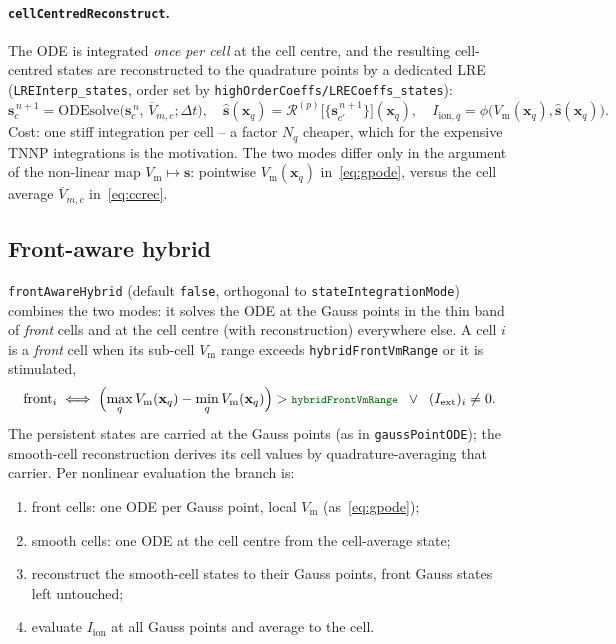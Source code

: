 \documentclass[11pt,a4paper]{article}
\newcommand{\code}[1]{\texttt{\small #1}}
\newcommand{\Vm}{V_{\text{m}}}
\newcommand{\Iion}{I_{\mathrm{ion}}}
\newcommand{\Iionsub}[1]{I_{\mathrm{ion},#1}}
\newcommand{\Iext}{I_{\mathrm{ext}}}
\newcommand{\dictkey}[1]{\textcolor{black!60!green}{\texttt{\footnotesize #1}}}
\begin{document}
\paragraph{\code{cellCentredReconstruct}.}
The ODE is integrated \emph{once per cell} at the cell centre, and the
resulting cell-centred states are reconstructed to the quadrature points by a
dedicated LRE (\code{LREInterp\_states}, order set by
\dictkey{highOrderCoeffs/LRECoeffs\_states}):
\begin{equation}
  \mathbf{s}_c^{\,n+1}
   = \mathrm{ODEsolve}\!\bigl(\mathbf{s}_c^{\,n},\,\overline{V}_{m,c};\Delta t\bigr),
  \quad
  \widehat{\mathbf{s}}(\mathbf{x}_q)
   = \mathcal{R}^{(p)}\!\bigl[\{\mathbf{s}_{c'}^{\,n+1}\}\bigr](\mathbf{x}_q),
  \quad
  \Iionsub{q}=\phi\bigl(\Vm(\mathbf{x}_q),\widehat{\mathbf{s}}(\mathbf{x}_q)\bigr).
  \label{eq:ccrec}
\end{equation}
Cost: one stiff integration per cell -- a factor $N_q$ cheaper, which for the
expensive TNNP integrations is the motivation. The two modes differ only in the
argument of the non-linear map $\Vm\!\mapsto\!\mathbf{s}$: pointwise
$\Vm(\mathbf{x}_q)$ in~\eqref{eq:gpode}, versus the cell average
$\overline{V}_{m,c}$ in~\eqref{eq:ccrec}.

\subsection{Front-aware hybrid}
\label{sec:hybrid}

\dictkey{frontAwareHybrid} (default \code{false}, orthogonal to
\dictkey{stateIntegrationMode}) combines the two modes: it solves the
ODE at the Gauss points in the thin band of \emph{front} cells and at the cell
centre (with reconstruction) everywhere else. A cell $i$ is a \emph{front} cell
when its sub-cell $\Vm$ range exceeds \dictkey{hybridFrontVmRange} or it is
stimulated,
\begin{equation}
  \text{front}_i \;\Longleftrightarrow\;
  \Bigl(\max_q\Vm(\mathbf{x}_q)-\min_q\Vm(\mathbf{x}_q)\Bigr)
     > \dictkey{hybridFrontVmRange}
  \;\;\vee\;\; (\Iext)_i\neq 0 .
  \label{eq:frontflag}
\end{equation}
The persistent states are carried at the Gauss points (as in
\code{gaussPointODE}); the smooth-cell reconstruction derives its cell values
by quadrature-averaging that carrier. Per nonlinear evaluation the branch is:
\begin{enumerate}[topsep=2pt,itemsep=1pt,label=(\alph*)]
  \item front cells: one ODE per Gauss point, local $\Vm$ (as~\eqref{eq:gpode});
  \item smooth cells: one ODE at the cell centre from the cell-average state;
  \item reconstruct the smooth-cell states to their Gauss points, front Gauss
        states left untouched;
  \item evaluate $\Iion$ at all Gauss points and average to the cell.
\end{enumerate}
\end{document}
